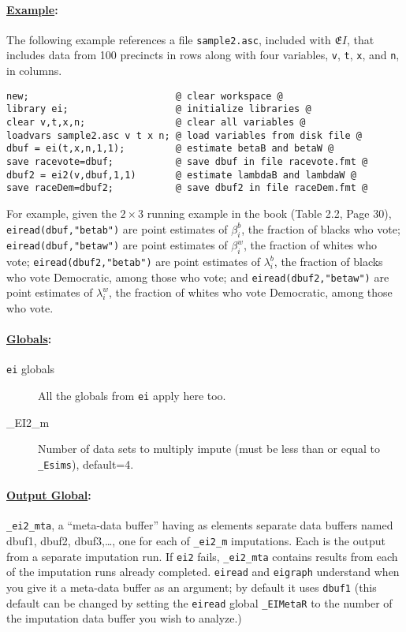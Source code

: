 \documentclass[11pt,titlepage]{article}
\newcommand{\EI}{\ensuremath{{\mathfrak EI}}}
\begin{document}
\paragraph{\underline{Example}:}
The following example references a file \texttt{sample2.asc}, included
with \EI, that includes data from 100 precincts in rows along with
four variables, \texttt{v}, \texttt{t}, \texttt{x}, and \texttt{n}, in
columns.
\begin{verbatim}
new;                          @ clear workspace @
library ei;                   @ initialize libraries @
clear v,t,x,n;                @ clear all variables @
loadvars sample2.asc v t x n; @ load variables from disk file @
dbuf = ei(t,x,n,1,1);         @ estimate betaB and betaW @
save racevote=dbuf;           @ save dbuf in file racevote.fmt @
dbuf2 = ei2(v,dbuf,1,1)       @ estimate lambdaB and lambdaW @
save raceDem=dbuf2;           @ save dbuf2 in file raceDem.fmt @
\end{verbatim}

For example, given the $2\times 3$ running example in the book (Table
2.2, Page 30), \texttt{eiread(dbuf,"betab")} are point estimates of
$\beta_i^b$, the fraction of blacks who vote;
\texttt{eiread(dbuf,"betaw")} are point estimates of $\beta_i^w$, the
fraction of whites who vote; \texttt{eiread(dbuf2,"betab")} are point
estimates of $\lambda_i^b$, the fraction of blacks who vote
Democratic, among those who vote; and \texttt{eiread(dbuf2,"betaw")}
are point estimates of $\lambda_i^w$, the fraction of whites who vote
Democratic, among those who vote.

\paragraph{\underline{Globals}:}
\begin{description}
\item[\texttt{ei} globals] All the globals from \texttt{ei} apply here
  too.
\item[\_EI2\_m] Number of data sets to multiply impute (must be less
  than or equal to \texttt{\_Esims}), default=4.
\end{description}

\paragraph{\underline{Output Global}:}
\texttt{\_ei2\_mta}, a ``meta-data buffer'' having as elements
separate data buffers named dbuf1, dbuf2, dbuf3,\ldots, one for each
of \texttt{\_ei2\_m} imputations.  Each is the output from a separate
imputation run.  If \texttt{ei2} fails, \texttt{\_ei2\_mta} contains
results from each of the imputation runs already completed.
\texttt{eiread} and \texttt{eigraph} understand when you give it a
meta-data buffer as an argument; by default it uses \texttt{dbuf1}
(this default can be changed by setting the \texttt{eiread} global
\texttt{\_EIMetaR} to the number of the imputation data buffer you wish
to analyze.)
\end{document}
